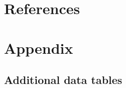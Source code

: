 \documentclass[final,3p,times,authoryear]{elsarticle}
\begin{document}

\section*{References}\label{sec:ref}
   
  


%
%
%





\section{Appendix}\label{sec:app}  
\subsection{Additional data tables}\label{app:tables}  
\end{document}

